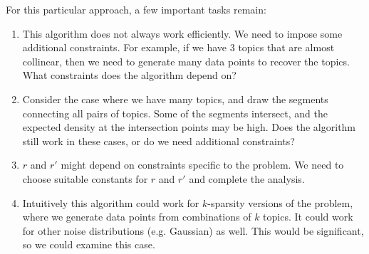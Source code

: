 \documentclass[12pt]{article}
\theoremstyle{definition}
\begin{document}
For this particular approach, a few important tasks remain:
\begin{enumerate}
\item This algorithm does not always work efficiently. We need to impose some additional constraints. For example, if we have 3 topics that are almost collinear, then we need to generate many data points to recover the topics. What constraints does the algorithm depend on?
\item Consider the case where we have many topics, and draw the segments connecting all pairs of topics. Some of the segments intersect, and the expected density at the intersection points may be high. Does the algorithm still work in these cases, or do we need additional constraints?
\item $r$ and $r'$ might depend on constraints specific to the problem. We need to choose suitable constants for $r$ and $r'$ and complete the analysis.
\item Intuitively this algorithm could work for $k$-sparsity versions of the problem, where we generate data points from combinations of $k$ topics. It could work for other noise distributions (e.g. Gaussian) as well. This would be significant, so we could examine this case.
\end{enumerate}






\end{document}

